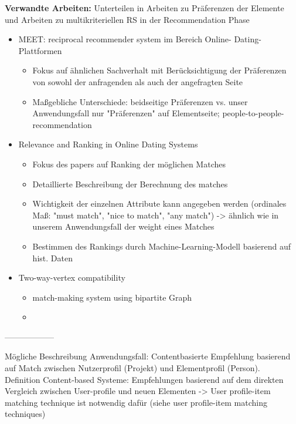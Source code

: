 \textbf{Verwandte Arbeiten:}
Unterteilen in Arbeiten zu Präferenzen der Elemente und Arbeiten zu multikriteriellen RS in der Recommendation Phase
\begin{itemize}
    \item MEET: reciprocal recommender system im Bereich Online- Dating- Plattformen %
    \begin{itemize}
        \item Fokus auf ähnlichen Sachverhalt mit Berücksichtigung der Präferenzen von sowohl der anfragenden als auch der angefragten Seite
        \item Maßgebliche Unterschiede: beidseitige Präferenzen vs. unser Anwendungsfall nur "Präferenzen" auf Elementseite; people-to-people-recommendation
    \end{itemize}
    \item Relevance and Ranking in Online Dating Systems %
    \begin{itemize}
        \item Fokus des papers auf Ranking der möglichen Matches
        \item Detaillierte Beschreibung der Berechnung des matches
        \item Wichtigkeit der einzelnen Attribute kann angegeben werden (ordinales Maß: "must match", "nice to match", "any match") -> ähnlich wie in unserem Anwendungsfall der weight eines Matches
        \item Bestimmen des Rankings durch Machine-Learning-Modell basierend auf hist. Daten
    \end{itemize}
    \item Two-way-vertex compatibility %
    \begin{itemize}
        \item match-making system using bipartite Graph
        \item 
    \end{itemize}
\end{itemize}

------------------

Mögliche Beschreibung Anwendungsfall: %
Contentbasierte Empfehlung basierend auf Match zwischen Nutzerprofil (Projekt) und Elementprofil (Person).\\
Definition Content-based Systeme: Empfehlungen basierend auf dem direkten Vergleich zwischen User-profile und neuen Elementen -> User profile-item matching technique ist notwendig dafür (siehe user profile-item matching techniques) %

